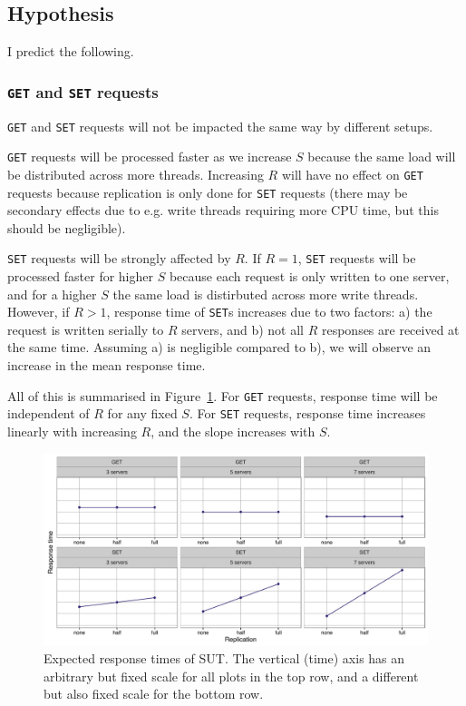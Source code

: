 \documentclass[11pt]{article}
\newcommand{\get}[0]{\texttt{GET}}
\newcommand{\set}[0]{\texttt{SET}}
\begin{document}
\subsection{Hypothesis}

I predict the following.

\subsubsection{\get{} and \set{} requests}
\get{} and \set{} requests will not be impacted the same way by different setups.

\get{} requests will be processed faster as we increase $S$ because the same load will be distributed across more threads. Increasing $R$ will have no effect on \get{} requests because replication is only done for \set{} requests (there may be secondary effects due to e.g. write threads requiring more CPU time, but this should be negligible).

\set{} requests will be strongly affected by $R$. If $R=1$, \set{} requests will be processed faster for higher $S$ because each request is only written to one server, and for a higher $S$ the same load is distirbuted across more write threads. However, if $R>1$, response time of \set{}s increases due to two factors: a) the request is written serially to $R$ servers, and b) not all $R$ responses are received at the same time. Assuming a) is negligible compared to b), we will observe an increase in the mean response time.

All of this is summarised in Figure~\ref{fig:exp2:hyp:replication}. For \get{} requests, response time will be independent of $R$ for any fixed $S$. For \set{} requests, response time increases linearly with increasing $R$, and the slope increases with $S$.

\begin{figure}[h]
\centering
\includegraphics[width=\textwidth]{figures/hypothesis_replication.pdf}
\caption{Expected response times of SUT. The vertical (time) axis has an arbitrary but fixed scale for all plots in the top row, and a different but also fixed scale for the bottom row.}
\label{fig:exp2:hyp:replication}
\end{figure}
\end{document}
